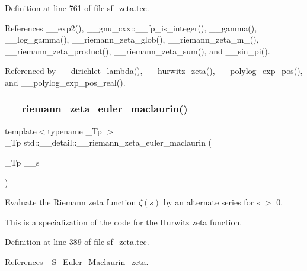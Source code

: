 Definition at line 761 of file sf\+\_\+zeta.\+tcc.



References \+\_\+\+\_\+exp2(), \+\_\+\+\_\+gnu\+\_\+cxx\+::\+\_\+\+\_\+fp\+\_\+is\+\_\+integer(), \+\_\+\+\_\+gamma(), \+\_\+\+\_\+log\+\_\+gamma(), \+\_\+\+\_\+riemann\+\_\+zeta\+\_\+glob(), \+\_\+\+\_\+riemann\+\_\+zeta\+\_\+m\+\_(), \+\_\+\+\_\+riemann\+\_\+zeta\+\_\+product(), \+\_\+\+\_\+riemann\+\_\+zeta\+\_\+sum(), and \+\_\+\+\_\+sin\+\_\+pi().



Referenced by \+\_\+\+\_\+dirichlet\+\_\+lambda(), \+\_\+\+\_\+hurwitz\+\_\+zeta(), \+\_\+\+\_\+polylog\+\_\+exp\+\_\+pos(), and \+\_\+\+\_\+polylog\+\_\+exp\+\_\+pos\+\_\+real().

\mbox{\label{namespacestd_1_1____detail_a84ac805996c4eeb8cbfa181e6e47f0ae}} 
\subsubsection{\texorpdfstring{\+\_\+\+\_\+riemann\+\_\+zeta\+\_\+euler\+\_\+maclaurin()}{\_\_riemann\_zeta\_euler\_maclaurin()}}
{\footnotesize\ttfamily template$<$typename \+\_\+\+Tp $>$ \\
\+\_\+\+Tp std\+::\+\_\+\+\_\+detail\+::\+\_\+\+\_\+riemann\+\_\+zeta\+\_\+euler\+\_\+maclaurin (\begin{DoxyParamCaption}\item[{\+\_\+\+Tp}]{\+\_\+\+\_\+s }\end{DoxyParamCaption})}



Evaluate the Riemann zeta function $ \zeta(s) $ by an alternate series for s $>$ 0. 

This is a specialization of the code for the Hurwitz zeta function. 

Definition at line 389 of file sf\+\_\+zeta.\+tcc.



References \+\_\+\+S\+\_\+\+Euler\+\_\+\+Maclaurin\+\_\+zeta.

\mbox{\label{namespacestd_1_1____detail_ab3542ea44b34da3d4865ed9a014e2951}} 
